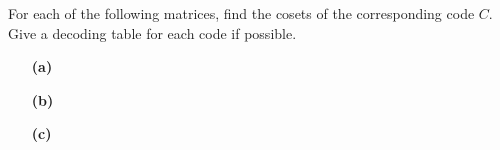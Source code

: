\begin{exercise}{}
For each of the following matrices, find the cosets of the
corresponding code $C$. Give a decoding table for each code if
possible. 
 
 
\vspace{3pt}        %
 
\hspace{-7pt}
\begin{minipage}[t]{4.6in}
\noindent
\begin{minipage}[t]{2.25in}
\begin{itemize}
 
 \item[{\bf (a)}]
 
\end{itemize}
\end{minipage} \hfill
\begin{minipage}[t]{2.25in}
\begin{itemize}
 
 \item[{\bf (b)}]
 
\end{itemize}
\end{minipage}
\end{minipage}
 
\vspace{3pt}
\hspace{-7pt}
\begin{minipage}[t]{4.6in}
\noindent
\begin{minipage}[t]{2.25in}
\begin{itemize}
 
 \item[{\bf (c)}]
 

\end{itemize}
\end{minipage}
\end{minipage}
\end{exercise}
